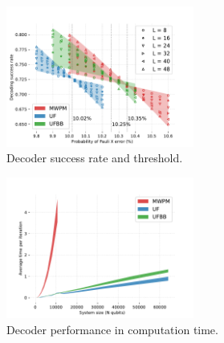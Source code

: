 \documentclass[10pt, a4paper, twoside, titlepage, usenames,dvipsnames]{report}
\begin{document}
\begin{figure}
    \centering
    \includegraphics[width=0.55\textwidth]{threshold.pdf}
    \caption{Decoder success rate and threshold.}\label{fig4}
\end{figure}
\begin{figure}
    \centering
    \includegraphics[width=0.55\textwidth]{time.pdf}
    \caption{Decoder performance in computation time.}\label{fig5}
\end{figure}
\end{document}
